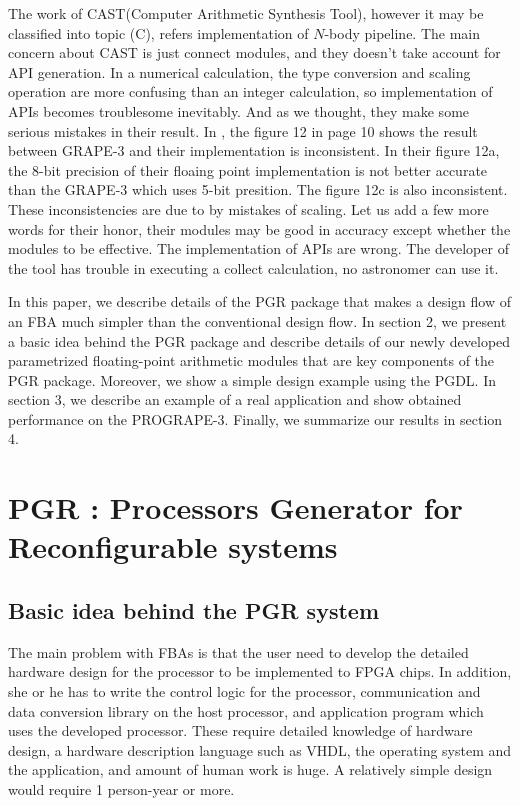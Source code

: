 \documentclass{llncs}
\begin{document}
The work of CAST(Computer Arithmetic Synthesis Tool), however it may
be classified into topic (C), refers implementation of $N$-body
pipeline. The main concern about CAST is just connect modules, and
they doesn't take account for API generation.  In a numerical
calculation, the type conversion and scaling operation are more
confusing than an integer calculation, so implementation of APIs
becomes troublesome inevitably. And as we thought, they make some
serious mistakes in their result\cite{THYL04}.  In \cite{THYL04}, the
figure 12 in page 10 shows the result between GRAPE-3 and their
implementation is inconsistent.  In their figure 12a, the 8-bit
precision of their floaing point implementation is not better accurate
than the GRAPE-3 which uses 5-bit presition. The figure 12c is also
inconsistent. These inconsistencies are due to by mistakes of scaling.
Let us add a few more words for their honor, their modules may be good
in accuracy except whether the modules to be effective.  The
implementation of APIs are wrong.  The developer of the tool has
trouble in executing a collect calculation, no astronomer can use it.






In this paper, we describe details of the PGR package
that makes a design flow of an FBA much simpler than
the conventional design flow.
In section 2, we present a basic idea behind the PGR package
and describe details of our newly developed parametrized 
floating-point arithmetic modules that are key components of the PGR package.
Moreover, we show a simple design example using the PGDL.
In section 3, we describe an example of a real application 
and show obtained performance on the PROGRAPE-3.
Finally, we summarize our results in section 4.
%
\section{PGR : Processors Generator for Reconfigurable systems}
\subsection{Basic idea behind the PGR system}

The main problem with FBAs is that the user need to
develop the detailed hardware design for the processor to be
implemented to FPGA chips. In addition, she or he has to write the
control logic for the processor, communication and data conversion
library on the host processor, and application program which uses the
developed processor. These require detailed knowledge of hardware
design, a hardware description language such as VHDL, the operating
system and the application, and amount of human work is huge. A
relatively simple design would require 1 person-year or more.
\end{document}
